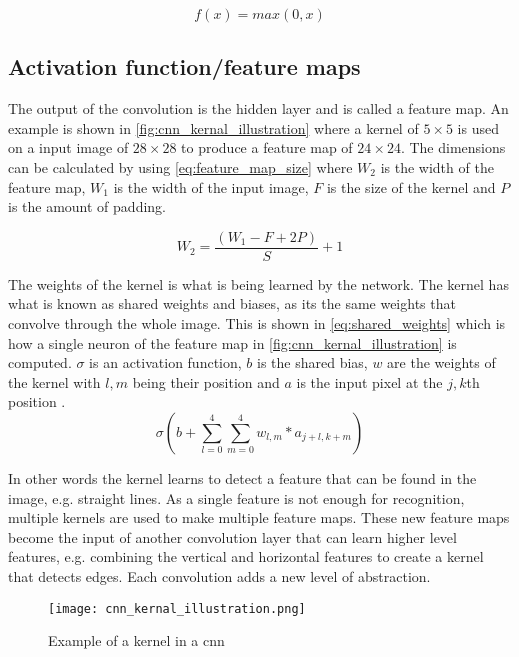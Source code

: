 \begin{equation}
\label{eq:ReluFunction}
f(x) = max(0,x)
\end{equation}

\subsection{Activation function/feature maps}
The output of the convolution is the hidden layer and is called a feature map. An example is shown in \autoref{fig:cnn_kernal_illustration} where a kernel of $5\times5$ is used on a input image of $28\times28$ to produce a feature map of $24\times24$. The dimensions can be calculated by using \autoref{eq:feature_map_size}  where $W_2$ is the width of the feature map, $W_1$ is the width of the input image, $F$ is the size of the kernel and $P$ is the amount of padding.  

\begin{equation}
\label{eq:feature_map_size}
W_2 = \frac{(W_1-F+2P)}{S} +1
\end{equation}

The weights of the kernel is what is being learned by the network. The kernel has what is known as shared weights and biases, as its the same weights that convolve through the whole image. This is shown in \autoref{eq:shared_weights} which is how a single neuron of the feature map in \autoref{fig:cnn_kernal_illustration} is computed. $\sigma$ is an activation function, $b$ is the shared bias,  $w$ are the weights of the kernel with $l,m$ being their position and $a$ is the input pixel at the $j,k$th position
.
\begin{equation}
\label{eq:shared_weights}
\sigma(b+\sum\limits_{l=0}^4 \sum\limits_{m=0}^4 w_{l,m}*a_{j+l,k+m})
\end{equation}


In other words the kernel learns to detect a feature that can be found in the image, e.g. straight lines. As a single feature is not enough for recognition, multiple kernels are used to make multiple feature maps. These new feature maps become the input of another convolution layer that can learn higher level features, e.g. combining the vertical and horizontal features to create a kernel that detects edges. Each convolution adds a new level of abstraction.

\begin{figure}[h]
\centering
\texttt{[image: cnn\_kernal\_illustration.png]}
\caption{Example of a kernel in a \gls{cnn} \citep{Nielsen2015}}
\label{fig:cnn_kernal_illustration}
\end{figure}

